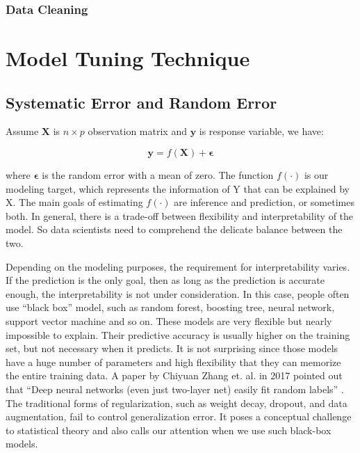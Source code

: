 \documentclass[12pt,]{krantz}
\theoremstyle{definition}
\theoremstyle{definition}
\theoremstyle{remark}
\begin{document}
\subsection{Data Cleaning}\label{data-cleaning-1}

\chapter{Model Tuning Technique}\label{model-tuning-technique}

\section{Systematic Error and Random
Error}\label{systematic-error-and-random-error}

Assume \(\mathbf{X}\) is \(n \times p\) observation matrix and
\(\mathbf{y}\) is response variable, we have:

\[\mathbf{y}=f(\mathbf{X})+\mathbf{\epsilon}\]

where \(\mathbf{\epsilon}\) is the random error with a mean of zero. The
function \(f(\cdot)\) is our modeling target, which represents the
information of Y that can be explained by X. The main goals of
estimating \(f(\cdot)\) are inference and prediction, or sometimes both.
In general, there is a trade-off between flexibility and
interpretability of the model. So data scientists need to comprehend the
delicate balance between the two.

Depending on the modeling purposes, the requirement for interpretability
varies. If the prediction is the only goal, then as long as the
prediction is accurate enough, the interpretability is not under
consideration. In this case, people often use ``black box'' model, such
as random forest, boosting tree, neural network, support vector machine
and so on. These models are very flexible but nearly impossible to
explain. Their predictive accuracy is usually higher on the training
set, but not necessary when it predicts. It is not surprising since
those models have a huge number of parameters and high flexibility that
they can memorize the entire training data. A paper by Chiyuan Zhang et.
al. in 2017 pointed out that ``Deep neural networks (even just two-layer
net) easily fit random labels'' \citep{rethinkDL}. The traditional forms
of regularization, such as weight decay, dropout, and data augmentation,
fail to control generalization error. It poses a conceptual challenge to
statistical theory and also calls our attention when we use such
black-box models.
\end{document}
